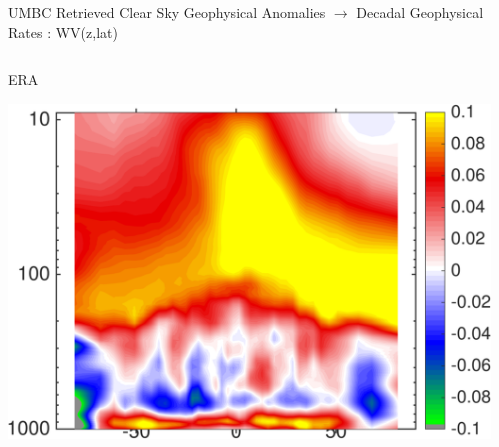 \documentclass[10pt,t]{beamer}
\begin{document}
\begin{frame}{UMBC Retrieved Clear Sky Geophysical Anomalies $\rightarrow$ Decadal Geophysical Rates : WV(z,lat)}
\vspace{-0.35in}

\begin{columns}
\begin{column}{0.45\columnwidth}
\begin{block}{\footnotesize ERA}
\vspace{-0.1in}
\begin{center}
\includegraphics[width=\linewidth]{Figs/ClearAnom/rawERAwvrates.png}
\end{center}
\end{block}
\end{column}

\begin{column}{0.45\columnwidth}
\end{column}
\end{columns}

\vspace{-0.25in}


\end{frame}
\end{document}
